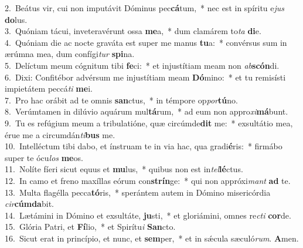 {2.~}Beátus vir, cui non imputávit Dóminus pec\textbf{cá}tum,~* nec est in spíritu e\textit{jus} \textbf{do}lus.\\
{3.~}Quóniam tácui, inveteravérunt ossa \textbf{me}a,~* dum clamárem to\textit{ta} \textbf{di}e.\\
{4.~}Quóniam die ac nocte graváta est super me manus \textbf{tu}a:~* convérsus sum in ærúmna mea, dum confígi\textit{tur} \textbf{spi}na.\\
{5.~}Delíctum meum cógnitum tibi \textbf{fe}ci:~* et injustítiam meam non \textit{ab}\textbf{scón}di.\\
{6.~}Dixi: Confitébor advérsum me injustítiam meam \textbf{Dó}mino:~* et tu remisísti impietátem peccá\textit{ti} \textbf{me}i.\\
{7.~}Pro hac orábit ad te omnis \textbf{san}ctus,~* in témpore op\textit{por}\textbf{tú}no.\\
{8.~}Verúmtamen in dilúvio aquárum mul\textbf{tá}rum,~* ad eum non appro\textit{xi}\textbf{má}bunt.\\
{9.~}Tu es refúgium meum a tribulatióne, quæ circúmde\textbf{dit} me:~* exsultátio mea, érue me a circumdán\textit{ti}\textbf{bus} me.\\
{10.~}Intelléctum tibi dabo, et ínstruam te in via hac, qua gradi\textbf{é}ris:~* firmábo super te ócu\textit{los} \textbf{me}os.\\
{11.~}Nolíte fíeri sicut equus et \textbf{mu}lus,~* quibus non est in\textit{tel}\textbf{lé}ctus.\\
{12.~}In camo et freno maxíllas eórum con\textbf{strín}ge:~* qui non appróxi\textit{mant} \textbf{ad} te.\\
{13.~}Multa flagélla pecca\textbf{tó}ris,~* sperántem autem in Dómino misericórdia \textit{cir}\textbf{cúm}\textbf{da}bit.\\
{14.~}Lætámini in Dómino et exsultáte, \textbf{ju}sti,~* et gloriámini, omnes re\textit{cti} \textbf{cor}de.\\
{15.~}Glória Patri, et \textbf{Fí}lio,~* et Spirítu\textit{i} \textbf{San}cto.\\
{16.~}Sicut erat in princípio, et nunc, et \textbf{sem}per,~* et in sǽcula sæculó\textit{rum}. \textbf{A}men.\\
